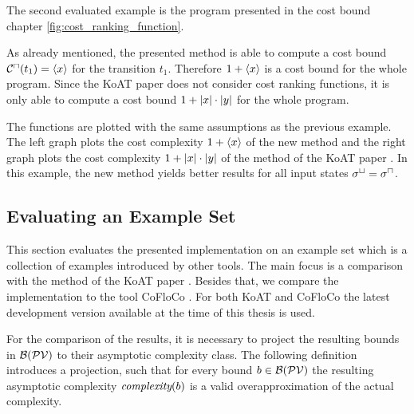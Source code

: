 The second evaluated example is the program presented in the cost bound chapter \ref{fig:cost_ranking_function}.



As already mentioned, the presented method is able to compute a cost bound ${\mathcal{C}^\sqcap}(t_1) = \langle x\rangle$ for the transition $t_1$.
Therefore $1 + \langle x\rangle$ is a cost bound for the whole program.
Since the KoAT paper \cite{koat} does not consider cost ranking functions, it is only able to compute a cost bound $1 + \left|x\right| \cdot \left|y\right|$ for the whole program.

The functions are plotted with the same assumptions as the previous example.
The left graph plots the cost complexity $1 + \langle x\rangle$ of the new method and the right graph plots the cost complexity $1 + \left|x\right| \cdot \left|y\right|$ of the method of the KoAT paper \cite{koat}.
In this example, the new method yields better results for all input states ${\sigma^\sqcup} = {\sigma^\sqcap}$.

\subsection{Evaluating an Example Set}

This section evaluates the presented implementation on an example set which is a collection of examples introduced by other tools.
The main focus is a comparison with the method of the KoAT paper \cite{koat}.
Besides that, we compare the implementation to the tool CoFloCo \cite{cofloco3}.
For both KoAT and CoFloCo the latest development version available at the time of this thesis is used.

For the comparison of the results, it is necessary to project the resulting bounds in $\mathcal{B}(\mathcal{PV})$ to their asymptotic complexity class.
The following definition introduces a projection, such that for every bound $b \in \mathcal{B}(\mathcal{PV})$ the resulting asymptotic complexity $\emph{complexity}(b)$ is a valid overapproximation of the actual complexity.

